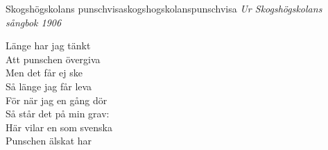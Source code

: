 \begin{song}{Skogshögskolans punschvisa}{skogshogskolanspunschvisa}
\textit{Ur Skogshögskolans sångbok 1906}
\begin{vers}
Länge har jag tänkt\\
Att punschen övergiva\\
Men det får ej ske\\
Så länge jag får leva\\
För när jag en gång dör\\
Så står det på min grav:\\
Här vilar en som svenska\\
Punschen älskat har\\
\end{vers}
\end{song}

